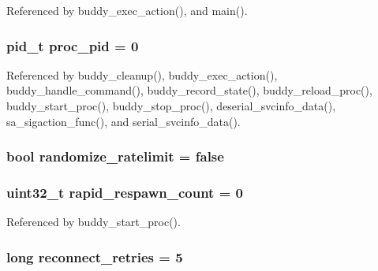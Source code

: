 Referenced by buddy\_\-exec\_\-action(), and main().

\subsubsection[{proc\_\-pid}]{\setlength{\rightskip}{0pt plus 5cm}pid\_\-t {\bf proc\_\-pid} = 0\hspace{0.3cm}{\ttfamily  [static]}}\label{buddy_8c_aa13c9951e918940d6f11d8ea9c2f4546}


Referenced by buddy\_\-cleanup(), buddy\_\-exec\_\-action(), buddy\_\-handle\_\-command(), buddy\_\-record\_\-state(), buddy\_\-reload\_\-proc(), buddy\_\-start\_\-proc(), buddy\_\-stop\_\-proc(), deserial\_\-svcinfo\_\-data(), sa\_\-sigaction\_\-func(), and serial\_\-svcinfo\_\-data().

\subsubsection[{randomize\_\-ratelimit}]{\setlength{\rightskip}{0pt plus 5cm}bool {\bf randomize\_\-ratelimit} = false}\label{buddy_8c_ac77b45e275dcc4a554fd495516deaa04}
\subsubsection[{rapid\_\-respawn\_\-count}]{\setlength{\rightskip}{0pt plus 5cm}uint32\_\-t {\bf rapid\_\-respawn\_\-count} = 0\hspace{0.3cm}{\ttfamily  [static]}}\label{buddy_8c_ae618973dea04a018a21366805669ca73}


Referenced by buddy\_\-start\_\-proc().

\subsubsection[{reconnect\_\-retries}]{\setlength{\rightskip}{0pt plus 5cm}long {\bf reconnect\_\-retries} = 5}\label{buddy_8c_a5d96c4625ef6fb62b61353fd2766b0d9}



